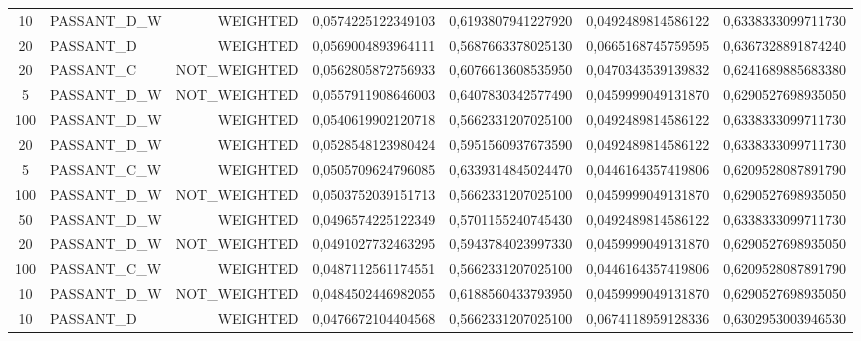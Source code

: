 \begin{table}[H]
{\begin{tabular}{ c l r c c c c }
				10 & PASSANT\_D\_W &   WEIGHTED & 0,0574225122349103 & 0,6193807941227920 & 0,0492489814586122 & 0,6338333099711730 \\
				
				20 &  PASSANT\_D &   WEIGHTED & 0,0569004893964111 & 0,5687663378025130 & 0,0665168745759595 & 0,6367328891874240 \\
				
				20 &  PASSANT\_C & NOT\_WEIGHTED & 0,0562805872756933 & 0,6076613608535950 & 0,0470343539139832 & 0,6241689885683380 \\
				
				5 & PASSANT\_D\_W & NOT\_WEIGHTED & 0,0557911908646003 & 0,6407830342577490 & 0,0459999049131870 & 0,6290527698935050 \\
				
				100 & PASSANT\_D\_W &   WEIGHTED & 0,0540619902120718 & 0,5662331207025100 & 0,0492489814586122 & 0,6338333099711730 \\
				
				20 & PASSANT\_D\_W &   WEIGHTED & 0,0528548123980424 & 0,5951560937673590 & 0,0492489814586122 & 0,6338333099711730 \\
				
				5 & PASSANT\_C\_W &   WEIGHTED & 0,0505709624796085 & 0,6339314845024470 & 0,0446164357419806 & 0,6209528087891790 \\
				
				100 & PASSANT\_D\_W & NOT\_WEIGHTED & 0,0503752039151713 & 0,5662331207025100 & 0,0459999049131870 & 0,6290527698935050 \\
				
				50 & PASSANT\_D\_W &   WEIGHTED & 0,0496574225122349 & 0,5701155240745430 & 0,0492489814586122 & 0,6338333099711730 \\
				
				20 & PASSANT\_D\_W & NOT\_WEIGHTED & 0,0491027732463295 & 0,5943784023997330 & 0,0459999049131870 & 0,6290527698935050 \\
				
				100 & PASSANT\_C\_W &   WEIGHTED & 0,0487112561174551 & 0,5662331207025100 & 0,0446164357419806 & 0,6209528087891790 \\
				
				10 & PASSANT\_D\_W & NOT\_WEIGHTED & 0,0484502446982055 & 0,6188560433793950 & 0,0459999049131870 & 0,6290527698935050 \\
				
				10 &  PASSANT\_D &   WEIGHTED & 0,0476672104404568 & 0,5662331207025100 & 0,0674118959128336 & 0,6302953003946530 \\
				

\end{tabular}}
\end{table}
